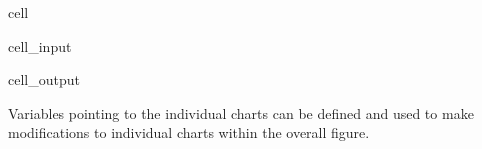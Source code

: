 \documentclass[letterpaper,10pt,english]{jupyterBook}
\begin{document}
\begin{sphinxuseclass}{cell}\begin{sphinxVerbatimInput}

\begin{sphinxuseclass}{cell_input}
\begin{sphinxVerbatim}[commandchars=\\\{\}]
\PYG{p}{[}\PYG{p}{]}
\PYG{p}{[}\PYG{p}{]}
\PYG{p}{[}\PYG{p}{]}
\PYG{p}{[}\PYG{p}{]}
\end{sphinxVerbatim}

\end{sphinxuseclass}\end{sphinxVerbatimInput}
\begin{sphinxVerbatimOutput}

\begin{sphinxuseclass}{cell_output}
\noindent{}

\end{sphinxuseclass}\end{sphinxVerbatimOutput}

\end{sphinxuseclass}
\sphinxAtStartPar
Variables pointing to the individual charts can be defined and used to make modifications to individual charts within the overall figure.
\end{document}
